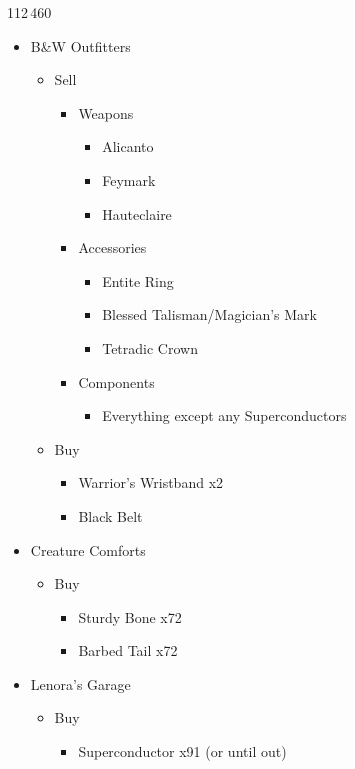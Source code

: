 \begin{shop}{112\,460}
\begin{multicols}{2}
\begin{itemize}
    \item B\&W Outfitters
    \begin{itemize}
        \item Sell
        \begin{itemize}
            \item Weapons
            \begin{itemize}
                \item Alicanto
                \item Feymark
                \item Hauteclaire
            \end{itemize}
            \item Accessories
            \begin{itemize}
                \item Entite Ring
                \item Blessed Talisman/Magician's Mark
                \item Tetradic Crown
            \end{itemize}
            \item Components
            \begin{itemize}
                \item Everything except any Superconductors
            \end{itemize}
        \end{itemize}
        \item Buy
        \begin{itemize}
	    \item Warrior's Wristband x2
	    \item Black Belt
        \end{itemize}
    \end{itemize}
    \columnbreak
    \item Creature Comforts
    \begin{itemize}
        \item Buy
        \begin{itemize}
            \item Sturdy Bone x72
            \item Barbed Tail x72
        \end{itemize}
    \end{itemize}
    \item Lenora's Garage
    \begin{itemize}
	\item Buy
        \begin{itemize}
            \item Superconductor x91 (or until out)
        \end{itemize}
    \end{itemize}
\end{itemize}
\end{multicols}
\end{shop}
